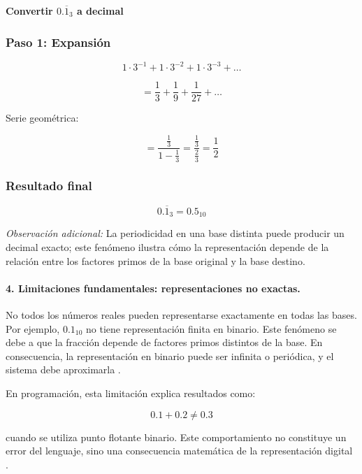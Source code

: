 \documentclass[12pt,twoside]{book}
\begin{document}
						\noindent
						\textbf{Convertir $0.\overline{1}_3$ a decimal}
						
						\subsubsection*{Paso 1: Expansión}
						
						\[
						1\cdot3^{-1} + 1\cdot3^{-2} + 1\cdot3^{-3} + \ldots
						\]
						
						\[
						= \frac{1}{3} + \frac{1}{9} + \frac{1}{27} + \ldots
						\]
						
						\noindent
						Serie geométrica:
						
						\[
						= \frac{\frac{1}{3}}{1 - \frac{1}{3}} = \frac{\frac{1}{3}}{\frac{2}{3}} = \frac{1}{2}
						\]
						
						\subsubsection*{Resultado final}
						
						\[
						0.\overline{1}_3 = 0.5_{10}
						\]
						
						\noindent
						\emph{Observación adicional:} La periodicidad en una base distinta puede producir un decimal exacto; este fenómeno ilustra cómo la representación depende de la relación entre los factores primos de la base original y la base destino.
						
						\paragraph{4. Limitaciones fundamentales: representaciones no exactas.} No todos los números reales pueden representarse exactamente en todas las bases. Por ejemplo, $0.1_{10}$ no tiene representación finita en binario. Este fenómeno se debe a que la fracción depende de factores primos distintos de la base. En consecuencia, la representación en binario puede ser infinita o periódica, y el sistema debe aproximarla \cite{Goldberg1991What,IEEE2019Standard754,Chapra2014Numerical}.
						
						En programación, esta limitación explica resultados como:
						
						\[
						0.1 + 0.2 \neq 0.3
						\]
						
						\noindent
						cuando se utiliza punto flotante binario. Este comportamiento no constituye un error del lenguaje, sino una consecuencia matemática de la representación digital \cite{Goldberg1991What,IEEE2019Standard754,Gaddis2022Starting}.
						
\end{document}
